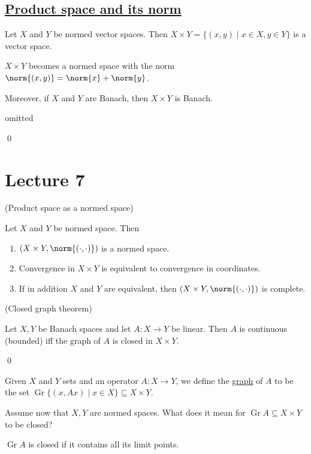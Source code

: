 \documentclass[x11names,reqno,14pt]{extarticle}
\begin{document}
\subsection*{\underline{Product space and its norm}}

Let $X$ and $Y$ be normed vector spaces. Then $X \times Y = \{(x, y) \mid x \in X, y \in Y\}$ is a vector space. 

\thm

$X \times Y$ becomes a normed space with the norm $\norm{(x, y)} = \norm{x} + \norm{y}$. 

Moreover, if $X$ and $Y$ are Banach, then $X \times Y$ is Banach. 

\proof

omitted

\qed

\section*{Lecture 7}

\thm(Product space as a normed space)

Let $X$ and $Y$ be normed space. Then
\begin{enumerate}
\item $(X\times Y, \norm{(\cdot,\cdot)})$ is a normed space.

\item Convergence in $X\times Y$ is equivalent to convergence in coordinates.

\item If in addition $X$ and $Y$ are equivalent, then $(X\times Y, \norm{(\cdot,\cdot)})$ is complete. 
\end{enumerate}

\thm(Closed graph theorem)

Let $X, Y$ be Banach spaces and let $A:X\to Y$ be linear. Then $A$ is continuous (bounded) iff the graph of $A$ is closed in $X\times Y$. 

\proof

\qed


Given $X$ and $Y$ sets and an operator $A:X\to Y$, we define the \underline{graph} of $A$ to be the set $\operatorname{Gr}\{(x, Ax) \mid x \in X\}\subseteq X \times Y$. 

Assume now that $X, Y$ are normed spaces. What does it mean for $\operatorname{Gr}A\subseteq X \times Y$ to be closed?

$\operatorname{Gr}A$ is closed if it contains all its limit points. 
\end{document}
